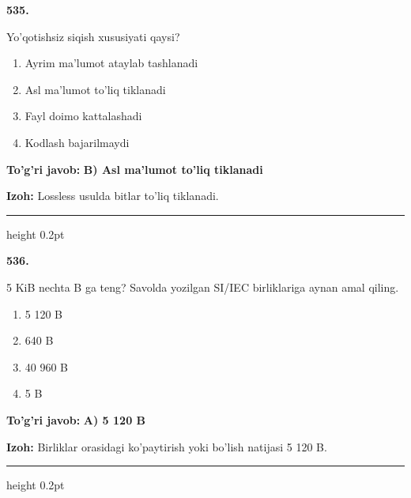 \documentclass[10pt,a4paper,oneside]{article}
\begin{document}
\noindent\textbf{\color{ink}535.}
\par
Yo'qotishsiz siqish xususiyati qaysi?
\begin{enumerate}[label=\Alph*),leftmargin=9mm]
\item Ayrim ma'lumot ataylab tashlanadi
\item Asl ma'lumot to'liq tiklanadi
\item Fayl doimo kattalashadi
\item Kodlash bajarilmaydi
\end{enumerate}
\begin{tcolorbox}[enhanced,breakable,colback=teal!4,colframe=teal!50!black,boxrule=0.5pt,arc=1.1mm,left=3mm,right=3mm,top=1.7mm,bottom=1.7mm,before skip=2mm,after skip=2mm]
\textbf{\color{teal}To'g'ri javob:} \textbf{B) Asl ma'lumot to'liq tiklanadi}
\par\smallskip
\textbf{Izoh:} Lossless usulda bitlar to'liq tiklanadi.
\end{tcolorbox}
\vspace{2mm}\hrule height 0.2pt \vspace{3mm}

\noindent\textbf{\color{ink}536.}
\par
5 KiB nechta B ga teng? Savolda yozilgan SI/IEC birliklariga aynan amal qiling.
\begin{enumerate}[label=\Alph*),leftmargin=9mm]
\item 5 120 B
\item 640 B
\item 40 960 B
\item 5 B
\end{enumerate}
\begin{tcolorbox}[enhanced,breakable,colback=teal!4,colframe=teal!50!black,boxrule=0.5pt,arc=1.1mm,left=3mm,right=3mm,top=1.7mm,bottom=1.7mm,before skip=2mm,after skip=2mm]
\textbf{\color{teal}To'g'ri javob:} \textbf{A) 5 120 B}
\par\smallskip
\textbf{Izoh:} Birliklar orasidagi ko'paytirish yoki bo'lish natijasi 5 120 B.
\end{tcolorbox}
\vspace{2mm}\hrule height 0.2pt \vspace{3mm}
\end{document}
